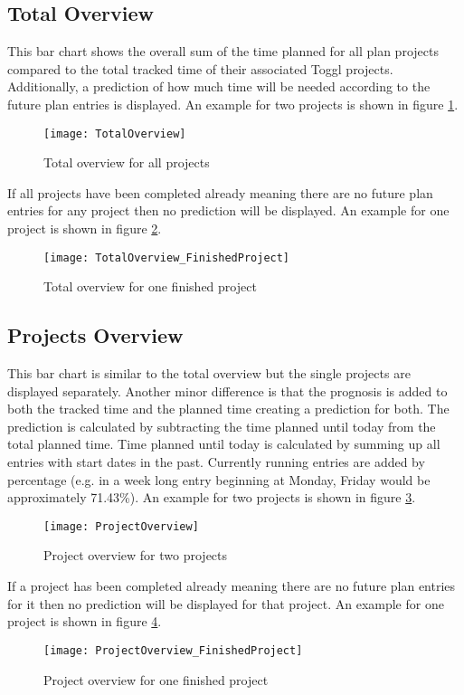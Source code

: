 \subsection{Total Overview}
This bar chart shows the overall sum of the time planned for all plan projects compared to the total tracked time of their associated Toggl projects. Additionally, a prediction of how much time will be needed according to the future plan entries is displayed. An example for two projects is shown in figure \ref{totalOverview}.
\begin{figure}[H]
	\centering
	\texttt{[image: TotalOverview]}
	\caption{Total overview for all projects}
	\label{totalOverview}
\end{figure}
If all projects have been completed already meaning there are no future plan entries for any project then no prediction will be displayed. An example for one project is shown in figure \ref{totalOverviewFinished}.
\begin{figure}[H]
	\centering
	\texttt{[image: TotalOverview\_FinishedProject]}
	\caption{Total overview for one finished project}
	\label{totalOverviewFinished}
\end{figure}

\subsection{Projects Overview}
This bar chart is similar to the total overview but the single projects are displayed separately. Another minor difference is that the prognosis is added to both the tracked time and the planned time creating a prediction for both. The prediction is calculated by subtracting the time planned until today from the total planned time. Time planned until today is calculated by summing up all entries with start dates in the past. Currently running entries are added by percentage (e.g. in a week long entry beginning at Monday, Friday would be approximately 71.43\%). An example for two projects is shown in figure \ref{projectOverview}.
\begin{figure}[H]
	\centering
	\texttt{[image: ProjectOverview]}
	\caption{Project overview for two projects}
	\label{projectOverview}
\end{figure}
If a project has been completed already meaning there are no future plan entries for it then no prediction will be displayed for that project. An example for one project is shown in figure \ref{projectOverviewFinished}.
\begin{figure}[H]
	\centering
	\texttt{[image: ProjectOverview\_FinishedProject]}
	\caption{Project overview for one finished project}
	\label{projectOverviewFinished}
\end{figure}

